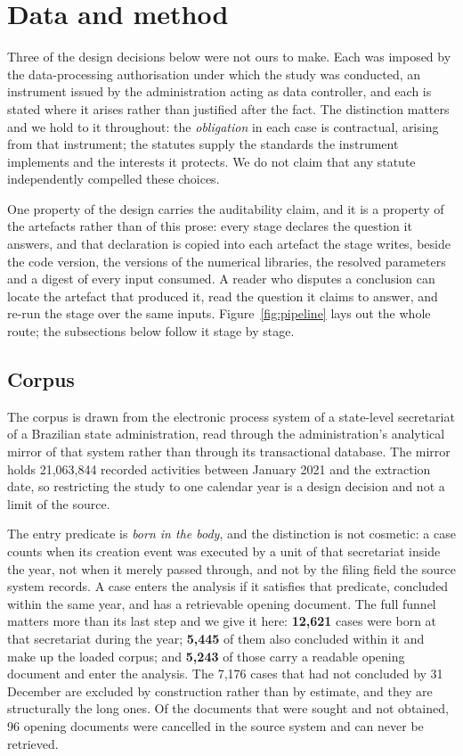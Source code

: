 \section{Data and method}\label{sec:method}

Three of the design decisions below were not ours to make. Each was imposed by the
data-processing authorisation under which the study was conducted, an instrument issued by the
administration acting as data controller, and each is stated where it arises rather than
justified after the fact. The distinction matters and we hold to it throughout: the
\emph{obligation} in each case is contractual, arising from that instrument; the statutes
supply the standards the instrument implements and the interests it protects. We do not claim
that any statute independently compelled these choices.

One property of the design carries the auditability claim, and it is a property of the
artefacts rather than of this prose: every stage declares the question it answers, and that
declaration is copied into each artefact the stage writes, beside the code version, the
versions of the numerical libraries, the resolved parameters and a digest of every input
consumed. A reader who disputes a conclusion can locate the artefact that produced it, read the
question it claims to answer, and re-run the stage over the same inputs.
Figure~\ref{fig:pipeline} lays out the whole route; the subsections below follow it stage by
stage.

\subsection{Corpus}\label{sec:corpus}

The corpus is drawn from the electronic process system of a state-level secretariat of a
Brazilian state administration, read through the administration's analytical mirror of that
system rather than through its transactional database. The mirror holds 21{,}063{,}844 recorded
activities between January 2021 and the extraction date, so restricting the study to one
calendar year is a design decision and not a limit of the source.

The entry predicate is \emph{born in the body}, and the distinction is not cosmetic: a case
counts when its creation event was executed by a unit of that secretariat inside the year, not
when it merely passed through, and not by the filing field the source system records. A case
enters the analysis if it satisfies that predicate, concluded within the same year, and has a
retrievable opening document. The full funnel matters more than its last step and we give it
here: \textbf{12{,}621} cases were born at that secretariat during the year; \textbf{5{,}445}
of them also concluded within it and make up the loaded corpus; and \textbf{5{,}243} of those
carry a readable opening document and enter the analysis. The 7{,}176 cases that had not
concluded by 31 December are excluded by construction rather than by estimate, and they are
structurally the long ones. Of the documents that were sought and not obtained, 96 opening
documents were cancelled in the source system and can never be retrieved.

